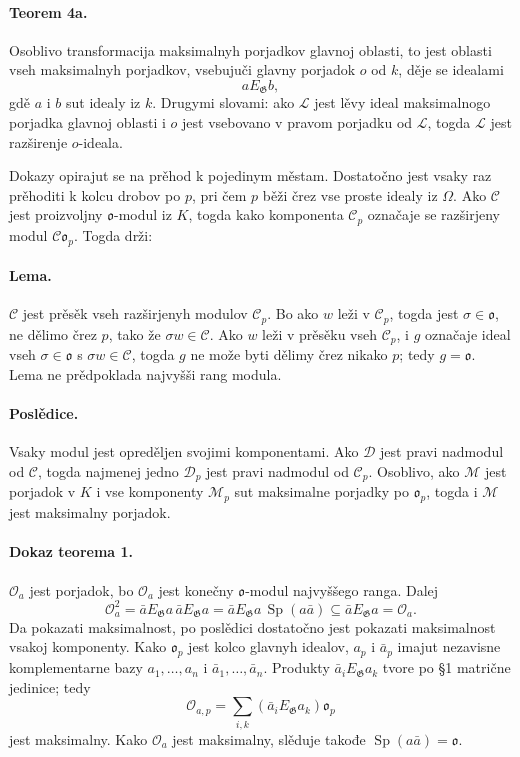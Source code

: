 \documentclass[11pt]{article}
\providecommand{\Sp}{\operatorname{Sp}}
\providecommand{\Gg}{\mathfrak G}
\providecommand{\oo}{\mathfrak o}
\begin{document}
\paragraph{Teorem 4a.}
Osoblivo transformacija maksimalnyh porjadkov glavnoj oblasti, to jest oblasti vseh maksimalnyh porjadkov, vsebujuči glavny porjadok \(o\) od \(k\), děje se idealami
\[
        aE_\Gg b,
\]
gdě \(a\) i \(b\) sut idealy iz \(k\). Drugymi slovami: ako \(\mathcal L\) jest lěvy ideal maksimalnogo porjadka glavnoj oblasti i \(o\) jest vsebovano v pravom porjadku od \(\mathcal L\), togda \(\mathcal L\) jest razširenje \(o\)-ideala.

Dokazy opirajut se na prěhod k pojedinym městam. Dostatočno jest vsaky raz prěhoditi k kolcu drobov po \(p\), pri čem \(p\) běži črez vse proste idealy iz \(\Omega\). Ako \(\mathcal C\) jest proizvoljny \(\oo\)-modul iz \(K\), togda kako komponenta \(\mathcal C_p\) označaje se razširjeny modul \(\mathcal C\oo_p\). Togda drži:

\paragraph{Lema.}
\(\mathcal C\) jest prěsěk vseh razširjenyh modulov \(\mathcal C_p\). Bo ako \(w\) leži v \(\mathcal C_p\), togda jest \(\sigma\in\oo\), ne dělimo črez \(p\), tako že \(\sigma w\in\mathcal C\). Ako \(w\) leži v prěsěku vseh \(\mathcal C_p\), i \(g\) označaje ideal vseh \(\sigma\in\oo\) s \(\sigma w\in\mathcal C\), togda \(g\) ne može byti dělimy črez nikako \(p\); tedy \(g=\oo\). Lema ne prědpoklada najvyšši rang modula.

\paragraph{Poslědice.}
Vsaky modul jest opreděljen svojimi komponentami. Ako \(\mathcal D\) jest pravi nadmodul od \(\mathcal C\), togda najmenej jedno \(\mathcal D_p\) jest pravi nadmodul od \(\mathcal C_p\). Osoblivo, ako \(\mathcal M\) jest porjadok v \(K\) i vse komponenty \(\mathcal M_p\) sut maksimalne porjadky po \(\oo_p\), togda i \(\mathcal M\) jest maksimalny porjadok.

\paragraph{Dokaz teorema 1.}
\(\mathcal O_a\) jest porjadok, bo \(\mathcal O_a\) jest konečny \(\oo\)-modul najvyššego ranga. Dalej
\[
        \mathcal O_a^2
        =\bar aE_\Gg a\,\bar aE_\Gg a
        =\bar aE_\Gg a\,\Sp(a\bar a)
        \subseteq \bar aE_\Gg a=\mathcal O_a.
\]
Da pokazati maksimalnost, po poslědici dostatočno jest pokazati maksimalnost vsakoj komponenty. Kako \(\oo_p\) jest kolco glavnyh idealov, \(a_p\) i \(\bar a_p\) imajut nezavisne komplementarne bazy \(a_1,\ldots,a_n\) i \(\bar a_1,\ldots,\bar a_n\). Produkty \(\bar a_iE_\Gg a_k\) tvore po §1 matrične jedinice; tedy
\[
        \mathcal O_{a,p}=\sum_{i,k}(\bar a_iE_\Gg a_k)\oo_p
\]
jest maksimalny. Kako \(\mathcal O_a\) jest maksimalny, slěduje takođe \(\Sp(a\bar a)=\oo\).
\end{document}
